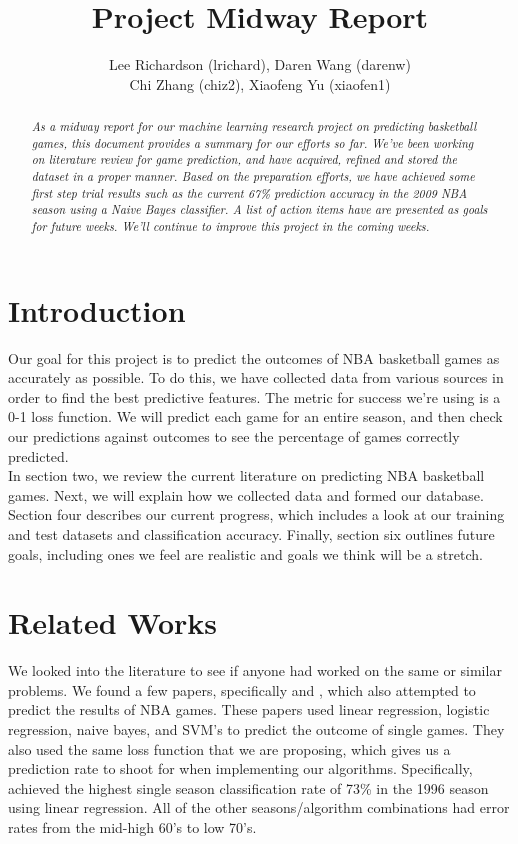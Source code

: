 \documentclass{article}
\title{Project Midway Report}
\author{Lee Richardson (lrichard), Daren Wang (darenw) \\ Chi Zhang (chiz2), Xiaofeng Yu (xiaofen1)\\}
\begin{document}
\maketitle

	\begin{abstract}
		\em{As a midway report for our machine learning research project on predicting basketball games, this document provides a summary for our efforts so far. We've been working on literature review for game prediction, and have acquired, refined and stored the dataset in a proper manner. Based on the preparation efforts, we have achieved some first step trial results such as the current 67\% prediction accuracy in the 2009 NBA season using a Naive Bayes classifier. A list of action items have are presented as goals for future weeks. We'll continue to improve this project in the coming weeks.}
	\end{abstract}

\section{Introduction}
	Our goal for this project is to predict the outcomes of NBA basketball games as accurately as possible. To do this, we have collected data from various sources in order to find the best predictive features. The metric for success we're using is a 0-1 loss function. We will predict each game for an entire season, and then check our predictions against outcomes to see the percentage of games correctly predicted. \\

	In section two, we review the current literature on predicting NBA basketball games. Next, we will explain how we collected data and formed our database. Section four describes our current progress, which includes a look at our training and test datasets and classification accuracy. Finally, section six outlines future goals, including ones we feel are realistic and goals we think will be a stretch. 

\section{Related Works}
	We looked into the literature to see if anyone had worked on the same or similar problems. We found a few papers, specifically \cite{nba_oracle} and \cite{data_mining}, which also attempted to predict the results of NBA games. These papers used linear regression, logistic regression, naive bayes, and SVM's to predict the outcome of single games. They also used the same loss function that we are proposing, which gives us a prediction rate to shoot for when implementing our algorithms. Specifically, \cite{nba_oracle} achieved the highest single season classification rate of 73\% in the 1996 season using linear regression. All of the other seasons/algorithm combinations had error rates from the mid-high 60's to low 70's. \\
\end{document}
